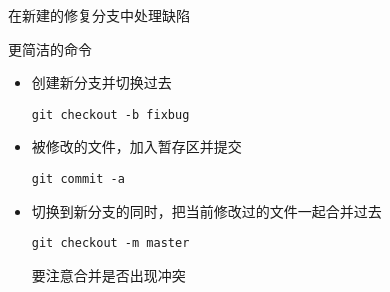 \begin{frame}{在新建的修复分支中处理缺陷}
\end{frame}

\begin{frame}[<+->][fragile]{更简洁的命令}
    \begin{itemize}
        \item 创建新分支并切换过去
        \begin{Verbatim}[frame=single,commandchars=\\\{\}]
git checkout -b fixbug      
        \end{Verbatim}
        \item 被修改的文件，加入暂存区并提交
        \begin{Verbatim}[frame=single,commandchars=\\\{\}]
git commit -a
        \end{Verbatim}
        \item 切换到新分支的同时，把当前修改过的文件一起合并过去
        \begin{Verbatim}[frame=single,commandchars=\\\{\}]
git checkout -m master
        \end{Verbatim}
        要注意合并是否出现冲突
    \end{itemize}
\end{frame}


